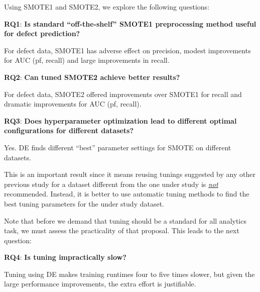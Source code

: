 \documentclass[sigconf,review, anonymous]{acmart}
\theoremstyle{break}
\theoremstyle{break}
\begin{document}
Using SMOTE1 and SMOTE2, we
explore  the following  questions:  
 
  \textbf{RQ1}: \textbf{Is standard ``off-the-shelf'' SMOTE1 preprocessing method useful for defect prediction?} 

 \begin{lesson}For defect data, SMOTE1 has adverse effect on 
 precision, modest improvements for AUC (pf, recall) and large improvements in recall.
 \end{lesson}

 \textbf{RQ2}: \textbf{Can tuned SMOTE2 achieve better results?} 
 
 \begin{lesson}For defect data, SMOTE2  
 offered    improvements over SMOTE1 for recall
 and dramatic improvements for AUC (pf, recall).
 \end{lesson}
 
 \textbf{RQ3}: \textbf{Does hyperparameter optimization lead to different optimal configurations for different datasets?} 
 
 \begin{lesson}Yes. DE finds different ``best'' parameter settings for SMOTE on different datasets.
 \end{lesson}
  This is an important result
  since it means
  reusing tunings suggested  by  any other  previous study  for a dataset different from the one under study is \underline{{\em not}} recommended. Instead,  it is better to
      use automatic tuning  methods  to find the best tuning parameters for the 
      under study dataset.
      
       Note that
 before we demand that tuning should be a
 standard for all analytics task,
 we must assess the practicality of that
 proposal. This leads to the next question:
 
   \textbf{RQ4}: \textbf{Is tuning 
   impractically
   slow?} 
 
 \begin{lesson}Tuning using DE makes training runtimes four to five times slower, but given
 the large performance improvements,
 the extra effort is justifiable. \end{lesson}
 
 
 
\end{document}
